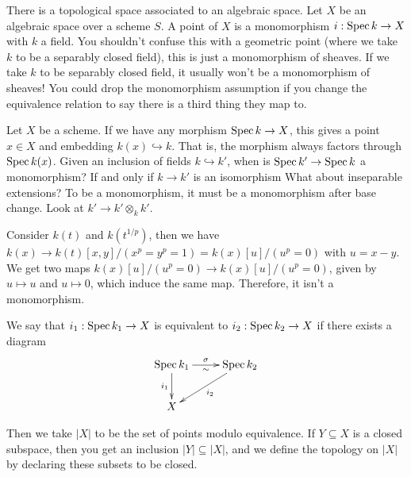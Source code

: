

 \bigskip

 There is a topological space associated to an algebraic space. Let $X$ be an algebraic
 space over a scheme $S$. A point of $X$ is a monomorphism $i:\operatorname{Spec} k\to X$ with $k$ a
 field. You shouldn't confuse this with a geometric point (where we take $k$ to be a
 separably closed field), this is just a monomorphism of sheaves. If we take $k$ to be
 separably closed field, it usually won't be a monomorphism of sheaves! You could drop
 the monomorphism assumption if you change the equivalence relation to say there is a
 third thing they map to. 
 \begin{example}
   Let $X$ be a scheme. If we have any morphism $\operatorname{Spec} k\to X$, this gives a point $x\in
   X$ and embedding $k(x)\hookrightarrow k$. That is, the morphism always factors through
   $\operatorname{Spec} k(x)$. Given an inclusion of fields $k\hookrightarrow k'$, when is $\operatorname{Spec} k'\to
   \operatorname{Spec} k$ a monomorphism? If and only if $k\to k'$ is an isomorphism   What about inseparable extensions? To be a monomorphism, it must be a
   monomorphism after base change. Look at $k'\to k'\otimes_k k'$.

   Consider $k(t)$ and $k(t^{1/p})$, then we have $k(x)\to
   k(t)[x,y]/(x^p=y^p=1)=k(x)[u]/(u^p=0)$ with $u=x-y$. We get two maps
   $k(x)[u]/(u^p=0)\to k(x)[u]/(u^p=0)$, given by $u\mapsto u$ and $u\mapsto 0$, which
   induce the same map. Therefore, it isn't a monomorphism.
 \end{example}
 We say that $i_1:\operatorname{Spec} k_1\to X$ is equivalent to $i_2:\operatorname{Spec} k_2\to X$ if there exists a
 diagram
 \[\xymatrix{
    \spec k_1 \ar[r]^\sigma_{\sim} \ar[d]_{i_1} & \spec k_2 \ar[dl]^{i_2}\\
    X
 }\]

 Then we take $|X|$ to be the set of points modulo equivalence. If $Y\subseteq X$ is a
 closed subspace, then you get an inclusion $|Y|\subseteq |X|$, and we define the
 topology on $|X|$ by declaring these subsets to be closed.

